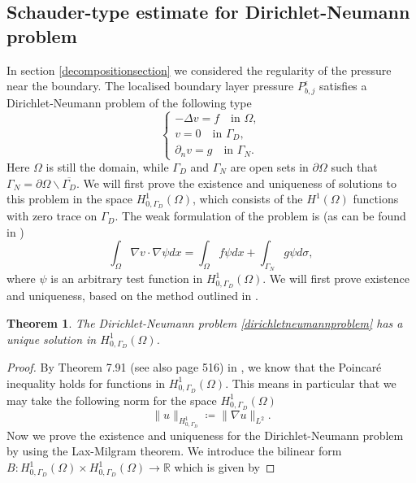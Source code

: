 \documentclass[12pt,a4paper]{article}
\newtheorem{theorem}{Theorem}[section]
\theoremstyle{definition}
\theoremstyle{remark}
\numberwithin{equation}{section}
\begin{document}
\begin{appendices}
\section{Schauder-type estimate for Dirichlet-Neumann problem} \label{schauderappendix2}
In section \ref{decompositionsection} we considered the regularity of the pressure near the boundary. The localised boundary layer pressure $P^\epsilon_{b,j}$ satisfies a Dirichlet-Neumann problem of the following type
\begingroup
\allowdisplaybreaks
\begin{equation} \label{dirichletneumannproblem}
\begin{cases}
- \Delta v = f \quad \text{in } \Omega, \\
v = 0 \quad \text{in } \Gamma_D, \\
\partial_n v = g \quad \text{in } \Gamma_N. 
\end{cases}
\end{equation}
\endgroup
Here $\Omega$ is still the domain, while $\Gamma_D$ and $\Gamma_N$ are open sets in $\partial \Omega$ such that $\Gamma_N = \partial \Omega \backslash \overline{\Gamma_D}$. We will first prove the existence and uniqueness of solutions to this problem in the space $H^1_{0,\Gamma_D} (\Omega)$, which consists of the $H^1 (\Omega)$ functions with zero trace on $\Gamma_D$. The weak formulation of the problem is (as can be found in \cite[~p. 516]{salsa})
\begin{equation}
\int_\Omega \nabla v \cdot \nabla \psi dx = \int_\Omega f \psi dx + \int_{\Gamma_N} g \psi d \sigma,
\end{equation}
where $\psi$ is an arbitrary test function in $H^1_{0,\Gamma_D} (\Omega)$. We will first prove existence and uniqueness, based on the method outlined in \cite[~Chapter 8]{salsa}.
\begin{theorem} \label{existencedirichletneumann}
The Dirichlet-Neumann problem \eqref{dirichletneumannproblem} has a unique solution in $H^1_{0,\Gamma_D} (\Omega)$.
\end{theorem}
\begin{proof}
By Theorem 7.91 (see also page 516) in \cite{salsa}, we know that the Poincaré inequality holds for functions in $H^1_{0,\Gamma_D} (\Omega)$. This means in particular that we may take the following norm for the space $H^1_{0,\Gamma_D} (\Omega)$
\begin{equation}
\lVert u \rVert_{H^1_{0,\Gamma_D}} \coloneqq \lVert \nabla u \rVert_{L^2}.
\end{equation}
Now we prove the existence and uniqueness for the Dirichlet-Neumann problem by using the Lax-Milgram theorem. We introduce the bilinear form $B : H^1_{0,\Gamma_D} (\Omega) \times H^1_{0,\Gamma_D} (\Omega) \rightarrow \mathbb{R}$ which is given by

\end{proof}
\end{appendices}
\end{document}
